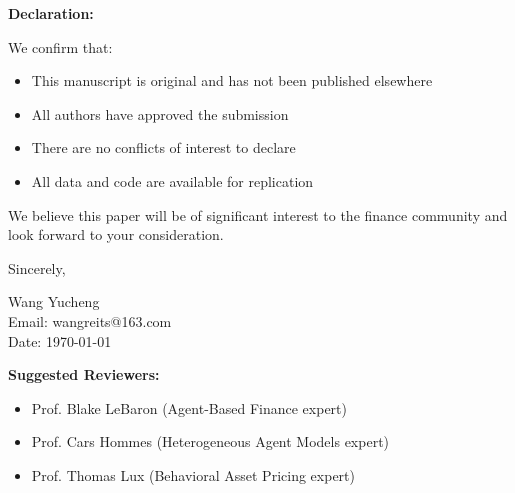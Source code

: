 \documentclass[11pt]{article}
\begin{document}
\vspace{0.3cm}

\noindent
\textbf{Declaration:}

\vspace{0.2cm}

\noindent
We confirm that:
\begin{itemize}
    \item This manuscript is original and has not been published elsewhere
    \item All authors have approved the submission
    \item There are no conflicts of interest to declare
    \item All data and code are available for replication
\end{itemize}

\vspace{0.3cm}

\noindent
We believe this paper will be of significant interest to the finance community and look forward to your consideration.

\vspace{1cm}

\noindent
Sincerely,

\vspace{0.5cm}

\noindent
Wang Yucheng \\
Email: wangreits@163.com \\
Date: \today

\vspace{0.5cm}

\noindent
\textbf{Suggested Reviewers:}
\begin{itemize}
    \item Prof. Blake LeBaron (Agent-Based Finance expert)
    \item Prof. Cars Hommes (Heterogeneous Agent Models expert)
    \item Prof. Thomas Lux (Behavioral Asset Pricing expert)
\end{itemize}
\end{document}
